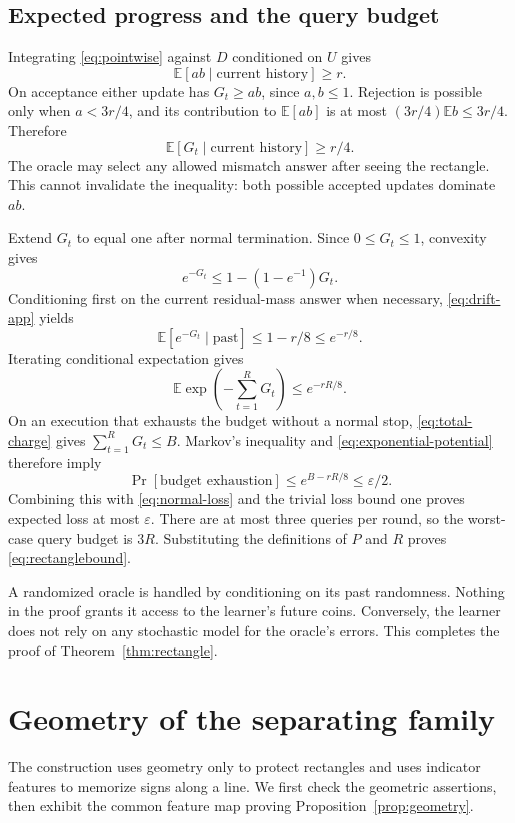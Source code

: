 \documentclass[11pt,letterpaper,pmlr,twoside]{jmlr}
\newcommand{\E}{\mathbb E}
\newcommand{\eps}{\varepsilon}
\begin{document}
\subsection{Expected progress and the query budget}
Integrating \eqref{eq:pointwise} against $D$ conditioned on $U$ gives
\[
 \E[ab\mid\text{current history}]\ge r.
\]
On acceptance either update has $G_t\ge ab$, since $a,b\le1$. Rejection is possible only when $a<3r/4$, and its contribution to $\E[ab]$ is at most $(3r/4)\E b\le3r/4$. Therefore
\begin{equation}
 \E[G_t\mid\text{current history}]\ge r/4.
\label{eq:drift-app}
\end{equation}
The oracle may select any allowed mismatch answer after seeing the rectangle. This cannot invalidate the inequality: both possible accepted updates dominate $ab$.

Extend $G_t$ to equal one after normal termination. Since $0\le G_t\le1$, convexity gives
\[
 e^{-G_t}\le1-(1-e^{-1})G_t.
\]
Conditioning first on the current residual-mass answer when necessary, \eqref{eq:drift-app} yields
\[
 \E[e^{-G_t}\mid\text{past}]
 \le1-r/8\le e^{-r/8}.
\]
Iterating conditional expectation gives
\begin{equation}
 \E\exp\!\left(-\sum_{t=1}^{R}G_t\right)\le e^{-rR/8}.
\label{eq:exponential-potential}
\end{equation}
On an execution that exhausts the budget without a normal stop, \eqref{eq:total-charge} gives $\sum_{t=1}^R G_t\le B$. Markov's inequality and \eqref{eq:exponential-potential} therefore imply
\[
 \Pr[\text{budget exhaustion}]
 \le e^{B-rR/8}\le\eps/2.
\]
Combining this with \eqref{eq:normal-loss} and the trivial loss bound one proves expected loss at most $\eps$. There are at most three queries per round, so the worst-case query budget is $3R$. Substituting the definitions of $P$ and $R$ proves \eqref{eq:rectanglebound}.

A randomized oracle is handled by conditioning on its past randomness. Nothing in the proof grants it access to the learner's future coins. Conversely, the learner does not rely on any stochastic model for the oracle's errors. This completes the proof of Theorem~\ref{thm:rectangle}.

\section{Geometry of the separating family}
\label{app:geometry}
The construction uses geometry only to protect rectangles and uses indicator features to memorize signs along a line. We first check the geometric assertions, then exhibit the common feature map proving Proposition~\ref{prop:geometry}.
\end{document}

